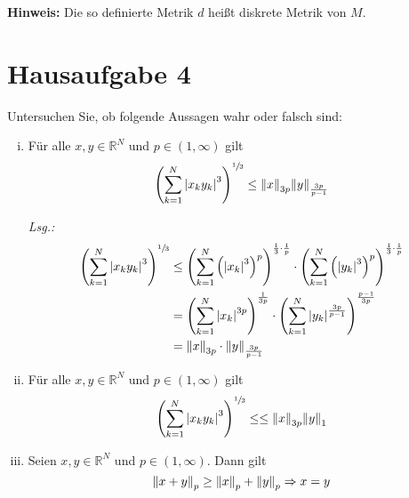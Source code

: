 \documentclass{article}
\begin{document}
\textbf{Hinweis:} Die so definierte Metrik $d$ heißt diskrete Metrik von $M$.

\newpage
\section*{Hausaufgabe 4}

Untersuchen Sie, ob folgende Aussagen wahr oder falsch sind:
\begin{enumerate}[(i)]
\item Für alle $x, y \in \mathbb{R}^N$ und $p \in (1, \infty)$ gilt
  \[
    \qty(\sum_{k = 1}^N \abs{x_k y_k}^3)^{\sfrac{1}{3}} \leq \norm{x}_{3p} \norm{y}_{\frac{3p}{p - 1}}
  \]

  \textit{Lsg.:}
  \begin{align*}
    \qty(\sum_{k = 1}^N \abs{x_k y_k}^3)^{\sfrac{1}{3}}
    &\leq \qty(\sum_{k = 1}^N \qty(\abs{x_k}^3)^p )^{\frac{1}{3} \cdot \frac{1}{p}} \cdot
      \qty(\sum_{k = 1}^N \qty(\abs{y_k}^3)^p )^{\frac{1}{3} \cdot \frac{1}{p}} \\
    &= \qty(\sum_{k = 1}^N \abs{x_k}^{3p})^{\frac{1}{3p}} \cdot
      \qty(\sum_{k = 1}^N \abs{y_k}^{\frac{3p}{p - 1}} )^{\frac{p - 1}{3p}} \\
    &= \norm{x}_{3p} \cdot \norm{y}_{\frac{3p}{p - 1}}
  \end{align*}
\item Für alle $x, y \in \mathbb{R}^N$ und $p \in (1, \infty)$ gilt
  \[
    \qty(\sum_{k = 1}^N \abs{x_k y_k}^3)^{\sfrac{1}{3}} \leq \leq \norm{x}_{3p} \norm{y}_1
  \]
\item Seien $x, y \in \mathbb{R}^N$ und $p \in (1, \infty)$. Dann gilt
  \[
    \norm{x + y}_p \geq \norm{x}_p + \norm{y}_p \Rightarrow x = y
  \]
\end{enumerate}
\end{document}
